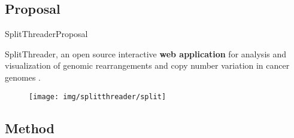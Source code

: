 \documentclass[10pt]{beamer}
\newcommand{\1}{
        	\setbeamertemplate{background}{
        		\texttt{[image: img/1\_BIO]}
        		\tikz[overlay] \fill[fill opacity=0.75,fill=white] (0,0) rectangle (-\paperwidth,\paperheight);
        	}
}
\begin{document}
\subsection{Proposal}

\begin{frame}{SplitThreader}{Proposal}	
	\begin{block}{}
		SplitThreader, an open source interactive \textbf{web application} for analysis and visualization of genomic rearrangements and copy number	variation in cancer genomes \cite{nattestad2016splitthreader}.
	\end{block}	

	\begin{figure}
		\centering
		\texttt{[image: img/splitthreader/split]}
	\end{figure}	
\end{frame}


\subsection{Method}
\end{document}

